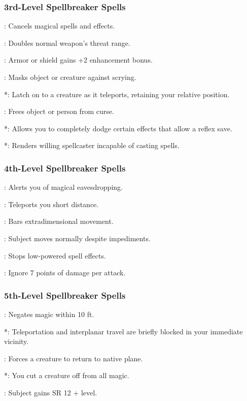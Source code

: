 \subsubsection{3rd-Level Spellbreaker Spells}
\begin{list}{}{\leftmargin=1em}
  \item {}: Cancels magical spells and effects.
  \item {}: Doubles normal weapon's threat range.
  \item {}: Armor or shield gains +2 enhancement bonus.
  \item {}: Masks object or creature against scrying.
  \item {}*: Latch on to a creature as it teleports, retaining your relative position.
  \item {}: Frees object or person from curse.
  \item {}*: Allows you to completely dodge certain effects that allow a reflex save.
  \item {}*: Renders willing spellcaster incapable of casting spells.
\end{list}
\subsubsection{4th-Level Spellbreaker Spells}
\begin{list}{}{\leftmargin=1em}
  \item {}: Alerts you of magical eavesdropping.
  \item {}: Teleports you short distance.
  \item {}: Bars extradimensional movement.
  \item {}: Subject moves normally despite impediments.
  \item {}: Stops low-powered spell effects.
  \item {}: Ignore 7 points of damage per attack.
\end{list}
\subsubsection{5th-Level Spellbreaker Spells}
\begin{list}{}{\leftmargin=1em}
  \item {}: Negates magic within 10 ft.
  \item {}*: Teleportation and interplanar travel are briefly blocked in your immediate vicinity.
  \item {}: Forces a creature to return to native plane.
  \item {}*: You cut a creature off from all magic.
  \item {}: Subject gains SR 12 + level.
\end{list}